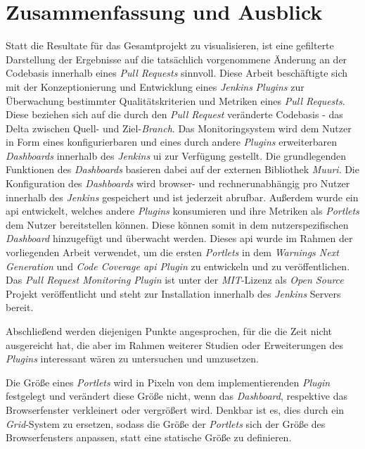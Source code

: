 \chapter{Zusammenfassung und Ausblick}
\label{chap:fazit}

Statt die Resultate für das Gesamtprojekt zu visualisieren, ist eine gefilterte Darstellung der Ergebnisse auf die tatsächlich vorgenommene Änderung an der Codebasis innerhalb eines \textit{Pull Requests} sinnvoll. Diese Arbeit beschäftigte sich mit der Konzeptionierung und Entwicklung eines \textit{Jenkins} \textit{Plugins} zur Überwachung bestimmter Qualitätskriterien und Metriken eines \textit{Pull Requests}. Diese beziehen sich auf die durch den \textit{Pull Request} veränderte Codebasis - das Delta zwischen Quell- und Ziel-\textit{Branch}. Das Monitoringsystem wird dem Nutzer in Form eines konfigurierbaren und eines durch andere \textit{Plugins} erweiterbaren \textit{Dashboards} innerhalb des \textit{Jenkins} \ac{ui} zur Verfügung gestellt. Die grundlegenden Funktionen des \textit{Dashboards} basieren dabei auf der externen Bibliothek \textit{Muuri}. Die Konfiguration des \textit{Dashboards} wird browser- und rechnerunabhängig pro Nutzer innerhalb des \textit{Jenkins} gespeichert und ist jederzeit abrufbar. Außerdem wurde ein \ac{api} entwickelt, welches andere \textit{Plugins} konsumieren und ihre Metriken als \textit{Portlets} dem Nutzer bereitstellen können. Diese können somit in dem nutzerspezifischen \textit{Dashboard} hinzugefügt und überwacht werden. Dieses \ac{api} wurde im Rahmen der vorliegenden Arbeit verwendet, um die ersten \textit{Portlets} in dem \textit{Warnings Next Generation} und \textit{Code Coverage \ac{api} Plugin} zu entwickeln und zu veröffentlichen. Das \textit{Pull Request Monitoring Plugin} ist unter der \textit{MIT}-Lizenz als \textit{Open Source} Projekt veröffentlicht und 
steht zur Installation innerhalb des \textit{Jenkins} Servers bereit. 

Abschließend werden diejenigen Punkte angesprochen, für die die Zeit nicht ausgereicht hat, die aber im Rahmen weiterer Studien oder Erweiterungen des \textit{Plugins} interessant wären zu untersuchen und umzusetzen.

Die Größe eines \textit{Portlets} wird in Pixeln von dem implementierenden \textit{Plugin} festgelegt und verändert diese Größe nicht, wenn das \textit{Dashboard}, respektive das Browserfenster verkleinert oder vergrößert wird. Denkbar ist es, dies durch ein \textit{Grid}-System zu ersetzen, sodass die Größe der \textit{Portlets} sich der Größe des Browserfensters anpassen, statt eine statische Größe zu definieren.


